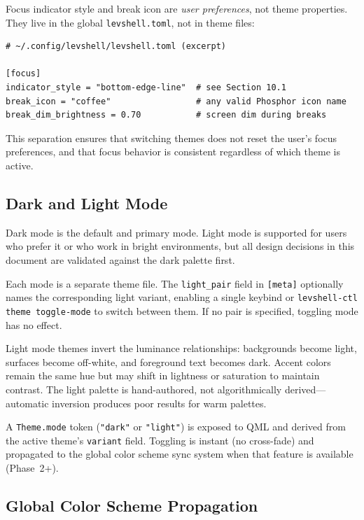 \documentclass[11pt,a4paper]{article}
\begin{document}
Focus indicator style and break icon are \emph{user preferences}, not theme properties. They live in the global \texttt{levshell.toml}, not in theme files:

\begin{lstlisting}[language={}]
# ~/.config/levshell/levshell.toml (excerpt)

[focus]
indicator_style = "bottom-edge-line"  # see Section 10.1
break_icon = "coffee"                 # any valid Phosphor icon name
break_dim_brightness = 0.70           # screen dim during breaks
\end{lstlisting}

This separation ensures that switching themes does not reset the user's focus preferences, and that focus behavior is consistent regardless of which theme is active.

\subsection{Dark and Light Mode}

Dark mode is the default and primary mode. Light mode is supported for users who prefer it or who work in bright environments, but all design decisions in this document are validated against the dark palette first.

Each mode is a separate theme file. The \texttt{light\_pair} field in \texttt{[meta]} optionally names the corresponding light variant, enabling a single keybind or \texttt{levshell-ctl theme toggle-mode} to switch between them. If no pair is specified, toggling mode has no effect.

Light mode themes invert the luminance relationships: backgrounds become light, surfaces become off-white, and foreground text becomes dark. Accent colors remain the same hue but may shift in lightness or saturation to maintain contrast. The light palette is hand-authored, not algorithmically derived---automatic inversion produces poor results for warm palettes.

A \texttt{Theme.mode} token (\texttt{"dark"} or \texttt{"light"}) is exposed to QML and derived from the active theme's \texttt{variant} field. Toggling is instant (no cross-fade) and propagated to the global color scheme sync system when that feature is available (Phase~2+).

\subsection{Global Color Scheme Propagation}
\end{document}
